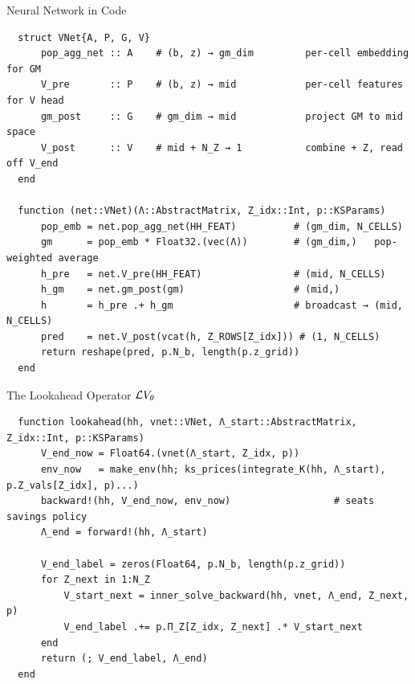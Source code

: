 \documentclass[10pt,aspectratio=169]{beamer}
\begin{document}
\begin{frame}[fragile]{Neural Network in Code}
  \begin{lstlisting}
  struct VNet{A, P, G, V}
      pop_agg_net :: A    # (b, z) → gm_dim         per-cell embedding for GM
      V_pre       :: P    # (b, z) → mid            per-cell features for V head
      gm_post     :: G    # gm_dim → mid            project GM to mid space
      V_post      :: V    # mid + N_Z → 1           combine + Z, read off V_end
  end

  function (net::VNet)(Λ::AbstractMatrix, Z_idx::Int, p::KSParams)
      pop_emb = net.pop_agg_net(HH_FEAT)          # (gm_dim, N_CELLS)
      gm      = pop_emb * Float32.(vec(Λ))        # (gm_dim,)   pop-weighted average
      h_pre   = net.V_pre(HH_FEAT)                # (mid, N_CELLS)
      h_gm    = net.gm_post(gm)                   # (mid,)
      h       = h_pre .+ h_gm                     # broadcast → (mid, N_CELLS)
      pred    = net.V_post(vcat(h, Z_ROWS[Z_idx])) # (1, N_CELLS)
      return reshape(pred, p.N_b, length(p.z_grid))
  end
  \end{lstlisting}
\end{frame}

\begin{frame}[fragile]{The Lookahead Operator $\mathcal{L} V_\theta$}
  \begin{lstlisting}
  function lookahead(hh, vnet::VNet, Λ_start::AbstractMatrix, Z_idx::Int, p::KSParams)
      V_end_now = Float64.(vnet(Λ_start, Z_idx, p))
      env_now   = make_env(hh; ks_prices(integrate_K(hh, Λ_start), p.Z_vals[Z_idx], p)...)
      backward!(hh, V_end_now, env_now)                  # seats savings policy
      Λ_end = forward!(hh, Λ_start)

      V_end_label = zeros(Float64, p.N_b, length(p.z_grid))
      for Z_next in 1:N_Z
          V_start_next = inner_solve_backward(hh, vnet, Λ_end, Z_next, p)
          V_end_label .+= p.Π_Z[Z_idx, Z_next] .* V_start_next
      end
      return (; V_end_label, Λ_end)
  end
  \end{lstlisting}
\end{frame}
\end{document}
